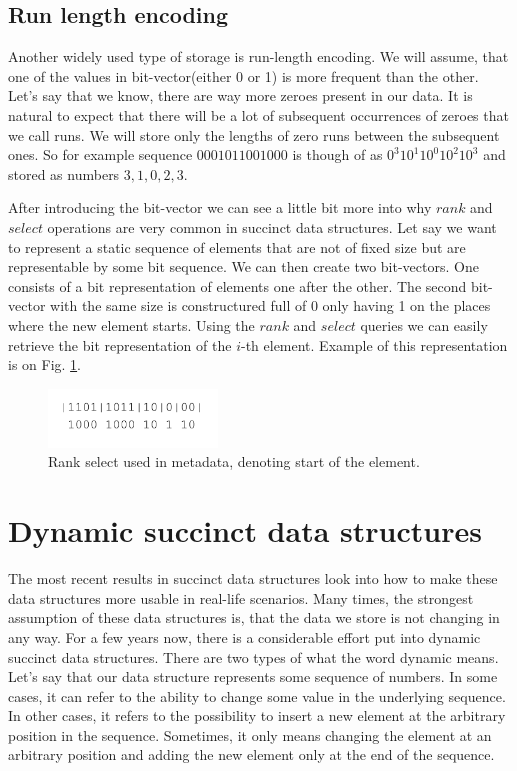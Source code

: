 \subsection{Run length encoding}

Another widely used type of storage is run-length encoding. We will assume, that one of the values in bit-vector(either 0 or 1) is more frequent than the other. Let's say that we know, there are way more zeroes present in our data. It is natural to expect that there will be a lot of subsequent occurrences of zeroes that we call runs. We will store only the lengths of zero runs between the subsequent ones. So for example
sequence $0001011001000$ is though of as $0^{3}10^{1}10^{0}10^{2}10^{3}$ and stored as numbers $3, 1, 0, 2, 3$.

After introducing the bit-vector we can see a little bit more into why $rank$ and $select$ operations are very common in succinct data structures. Let say we want to represent a static sequence of elements that are not of fixed size but are representable by some bit sequence.
We can then create two bit-vectors. One consists of a bit representation of elements one after the other.
The second bit-vector with the same size is constructured full of 0 only having 1 on the places where the new element starts.
Using the $rank$ and $select$ queries we can easily retrieve the bit representation of the $i$-th element.
Example of this representation is on Fig. \ref{obr:obr_rank_select}.

\begin{figure}
\centerline{\includegraphics[width=0.4\textwidth]{images/obr_rank_select}}
\caption[Rank select usage in representation of sequence of elements with different size]{Rank select used in metadata, denoting start of the element.}
\label{obr:obr_rank_select}
\end{figure}

\section{Dynamic succinct data structures}

The most recent results in succinct data structures look into how to make these data structures more usable in real-life scenarios. Many times, the
strongest assumption of these data structures is, that the data we store is not changing in any way. For a few years now, there is a considerable effort put into dynamic succinct data structures. There are two types of what the word dynamic means. Let's say that our data structure represents some sequence of numbers. In some cases, it can refer to the ability to change some value in the underlying sequence. In other cases, it refers to the possibility to insert a new element at the arbitrary position in the sequence. Sometimes, it only means changing the element at an arbitrary position and adding the new element only at the end of the sequence.

